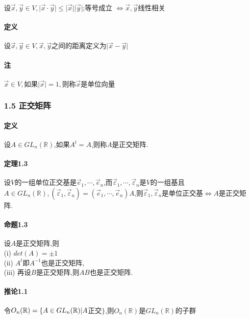 \documentclass{ctexart}
\begin{document}
设$\vec{x},\vec{y} \in V,\vert \vec{x}\cdot \vec{y} \vert \le \vert \vec{x} \vert \vert \vec{y} \vert$;等号成立 $ \Leftrightarrow \vec{x},\vec{y}$线性相关

\paragraph{定义}
设$\vec{x},\vec{y} \in V,\vec{x},\vec{y}$之间的距离定义为$\vert \vec{x}-\vec{y} \vert$

\paragraph{注}
$\vec{x} \in V,$如果$\vert \vec{x}\vert = 1,$则称$\vec{x}$是单位向量
\subsubsection{1.5 正交矩阵}

\paragraph{定义}
设$A \in GL_{n}(\mathbb{R})$,如果$A^{t}=A$,则称$A$是正交矩阵.

\paragraph{定理1.3}
设$V$的一组单位正交基是$\vec{e}_{1}, \cdots ,\vec{e}_{n}$,而$\vec{\varepsilon}_{1},\cdots ,\vec{\varepsilon}_{n}$是$V$的一组基且$A \in GL_{n}(\mathbb{R}),(\vec{\varepsilon}_{1},\vec{\varepsilon}_{n})=(\vec{e}_{1},\cdots ,\vec{e}_{n})A$,则$\vec{\varepsilon}_{1},\vec{\varepsilon}_{n}$是单位正交基$\Leftrightarrow A$是正交矩阵.

\paragraph{命题1.3}
设$A$是正交矩阵,则\\
(i) $det(A)=\pm1$\\
(ii) $A^{t}$即$A^{-1}$也是正交矩阵,\\
(iii) 再设$B$是正交矩阵,则$AB$也是正交矩阵.\\

\paragraph{推论1.1}
令$O_{n}(\mathbb{R})=\{A \in GL_{n}(\mathbb{R}) \arrowvert A$正交$\}$,则$O_{n}(\mathbb{R})$是$GL_{n}(\mathbb{R})$的子群
\end{document}

